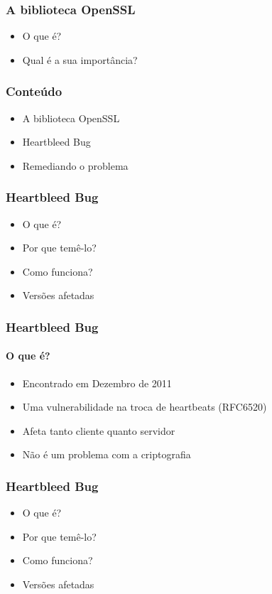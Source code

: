 \documentclass{beamer}
\begin{document}
\begin{frame}
	\frametitle{A biblioteca OpenSSL}
	\begin{itemize}
		\item \textcolor{covered}{O que é?}
		\item \textcolor{covered}{Qual é a sua importância?}
	\end{itemize}
\end{frame}

\begin{frame}
	\frametitle{Conteúdo}
	\begin{itemize}
		\item \textcolor{covered}{A biblioteca OpenSSL}
		\item Heartbleed Bug
		\item Remediando o problema
	\end{itemize}
\end{frame}

\begin{frame}
	\frametitle{Heartbleed Bug}
	\begin{itemize}
		\item O que é?
		\item Por que temê-lo?
		\item Como funciona?
		\item Versões afetadas
	\end{itemize}
\end{frame}

\begin{frame}
	\frametitle{Heartbleed Bug}
	\framesubtitle{O que é?}
	\begin{itemize}
		\item Encontrado em Dezembro de 2011
		\item Uma vulnerabilidade na troca de heartbeats (RFC6520)
		\item Afeta tanto cliente quanto servidor
		\item Não é um problema com a criptografia
	\end{itemize}
\end{frame}

\begin{frame}
	\frametitle{Heartbleed Bug}
	\begin{itemize}
		\item \textcolor{covered}{O que é?}
		\item Por que temê-lo?
		\item Como funciona?
		\item Versões afetadas
	\end{itemize}
\end{frame}
\end{document}
